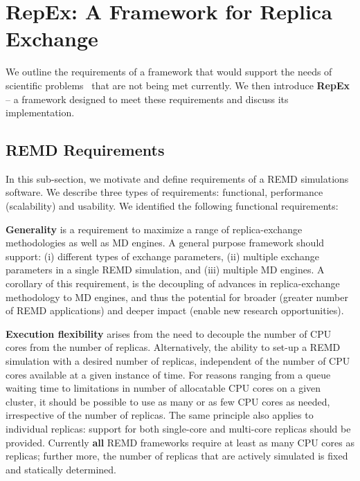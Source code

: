 \documentclass{sig-alternate-05-2015}
\begin{document}
\section{RepEx: A Framework for Replica Exchange} \label{repex.framework}

We outline the requirements of a framework that would support the needs of scientific problems~\cite{Ensing_AccChemRes_2006_v39_p73, Vanden-Eijnden_JComputChem_2009_v30_p1737, Dissanayake_Biochemistry_2015_v54_p1307} that are not being met currently. We then introduce {\bf RepEx} -- a framework designed to meet these requirements and discuss its implementation.

\subsection{REMD Requirements} \label{requirements}   

In this sub-section, we motivate and define requirements of a REMD simulations software. We describe three types of requirements: functional, performance (scalability) and usability.  We identified the following functional requirements:

\textbf{Generality} is a requirement to maximize a range of replica-exchange methodologies as well as MD engines. A general purpose framework should support: (i) different types of exchange parameters, (ii) multiple exchange parameters in a single REMD simulation, and (iii) multiple MD engines.  A corollary of this requirement, is the decoupling of advances in replica-exchange methodology to MD engines, and thus the potential for broader (greater number of REMD applications) and deeper impact (enable new research opportunities).

\textbf{Execution flexibility} arises from the need to decouple the number of CPU cores from the number of replicas. Alternatively, the ability to set-up a REMD simulation with a desired number of replicas, independent of the number of CPU cores available at a given instance of time.  For reasons ranging from a queue waiting time to limitations in number of allocatable CPU cores on a given cluster, it should be possible to use as many or as few CPU cores as needed, irrespective of the number of replicas. The same principle also applies to individual replicas: support for both single-core and multi-core replicas should be provided. Currently {\bf all} REMD frameworks require at least as many CPU cores as replicas; further more, the number of replicas that are actively simulated is fixed and statically determined. 
\end{document}

